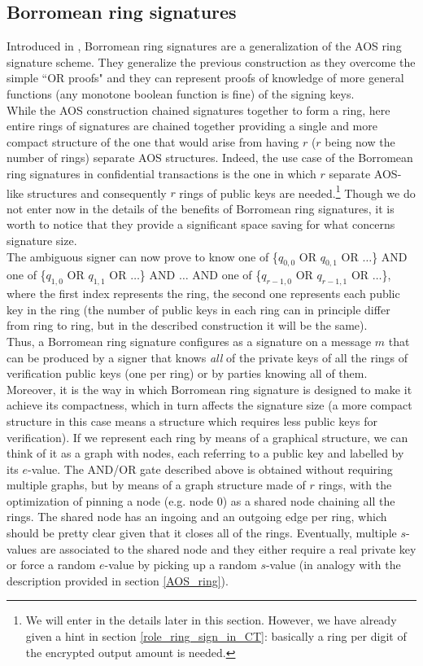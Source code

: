 \subsection{Borromean ring signatures}
\label{sec::Borromean_r_sig}
Introduced in \cite{Borromean}, Borromean ring signatures are a generalization of the AOS ring signature scheme. They generalize the previous construction as they overcome the simple ``OR proofs" and they can represent proofs of knowledge of more general functions (any monotone boolean function is fine) of the signing keys.\\
While the AOS construction chained signatures together to form a ring, here entire rings of signatures are chained together providing a single and more compact structure of the one that would arise from having $r$ ($r$ being now the number of rings) separate AOS structures. Indeed, the use case of the Borromean ring signatures in confidential transactions is the one in which $r$ separate AOS-like structures and consequently $r$ rings of public keys are needed.\footnote{We will enter in the details later in this section. However, we have already given a hint in section \ref{role_ring_sign_in_CT}: basically a ring per digit of the encrypted output amount is needed.} Though we do not enter now in the details of the benefits of Borromean ring signatures, it is worth to notice that they provide a significant space saving for what concerns signature size.\\
The ambiguous signer can now prove to know one of \{$q_{0,0}$ OR $q_{0,1}$ OR $\dots$\} AND one of \{$q_{1,0}$ OR $q_{1,1}$ OR $\dots$\} AND $\dots$ AND one of \{$q_{{r-1},{0}}$ OR $q_{{r-1},{1}}$ OR $\dots$\}, where the first index represents the ring, the second one represents each public key in the ring (the number of public keys in each ring can in principle differ from ring to ring, but in the described construction it will be the same).\\
Thus, a Borromean ring signature configures as a signature on a message $m$ that can be produced by a signer that knows \textit{all} of the private keys of all the rings of verification public keys (one per ring) or by parties knowing all of them.\\
Moreover, it is the way in which Borromean ring signature is designed to make it achieve its compactness, which in turn affects the signature size (a more compact structure in this case means a structure which requires less public keys for verification). If we represent each ring by means of a graphical structure, we can think of it as a graph with nodes, each referring to a public key and labelled by its $e$-value. The AND/OR gate described above is obtained without requiring multiple graphs, but by means of a graph structure made of $r$ rings, with the optimization of pinning a node (e.g. node 0) as a shared node chaining all the rings. The shared node has an ingoing and an outgoing edge per ring, which should be pretty clear given that it closes all of the rings. Eventually, multiple $s$-values are associated to the shared node and they either require a real private key or force a random $e$-value by picking up a random $s$-value (in analogy with the description provided in section \ref{AOS_ring}).\\
